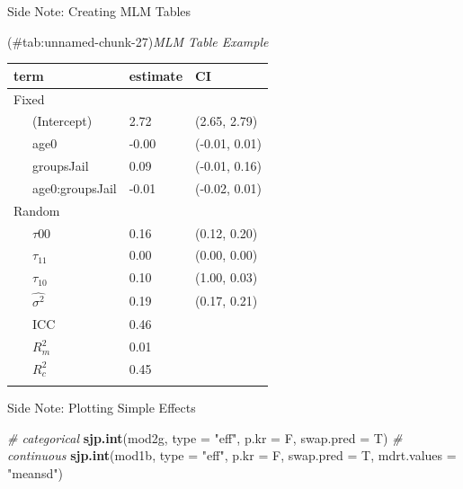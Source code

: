 \documentclass[ignorenonframetext,]{beamer}
\newenvironment{Shaded}{\begin{snugshade}}{\end{snugshade}}
\newcommand{\KeywordTok}[1]{\textcolor[rgb]{0.13,0.29,0.53}{\textbf{{#1}}}}
\newcommand{\DataTypeTok}[1]{\textcolor[rgb]{0.13,0.29,0.53}{{#1}}}
\newcommand{\DecValTok}[1]{\textcolor[rgb]{0.00,0.00,0.81}{{#1}}}
\newcommand{\StringTok}[1]{\textcolor[rgb]{0.31,0.60,0.02}{{#1}}}
\newcommand{\CommentTok}[1]{\textcolor[rgb]{0.56,0.35,0.01}{\textit{{#1}}}}
\newcommand{\NormalTok}[1]{{#1}}
\begin{document}
\begin{frame}[fragile]{Side Note: Creating MLM Tables}

\footnotesize

\begin{Shaded}
\end{Shaded}

(\#tab:unnamed-chunk-27)\emph{MLM Table Example}

\begin{longtable}[]{@{}lll@{}}
\toprule
term & estimate & CI\tabularnewline
\midrule
\endhead
Fixed & &\tabularnewline
~~~(Intercept) & 2.72 & (2.65, 2.79)\tabularnewline
~~~age0 & -0.00 & (-0.01, 0.01)\tabularnewline
~~~groupsJail & 0.09 & (-0.01, 0.16)\tabularnewline
~~~age0:groupsJail & -0.01 & (-0.02, 0.01)\tabularnewline
Random & &\tabularnewline
~~~\(\tau{00}\) & 0.16 & (0.12, 0.20)\tabularnewline
~~~\(\tau_{11}\) & 0.00 & (0.00, 0.00)\tabularnewline
~~~\(\tau_{10}\) & 0.10 & (1.00, 0.03)\tabularnewline
~~~\(\hat{\sigma^2}\) & 0.19 & (0.17, 0.21)\tabularnewline
~~~ICC & 0.46 &\tabularnewline
~~~\(R^2_m\) & 0.01 &\tabularnewline
~~~\(R^2_c\) & 0.45 &\tabularnewline
\normalsize & &\tabularnewline
\bottomrule
\end{longtable}

\end{frame}

\begin{frame}[fragile]{Side Note: Plotting Simple Effects}

\footnotesize

\begin{Shaded}
\begin{Highlighting}[]
\CommentTok{# categorical}
\KeywordTok{sjp.int}\NormalTok{(mod2g, }\DataTypeTok{type =} \StringTok{"eff"}\NormalTok{, }\DataTypeTok{p.kr =} \NormalTok{F, }\DataTypeTok{swap.pred =} \NormalTok{T)}
\CommentTok{# continuous}
\KeywordTok{sjp.int}\NormalTok{(mod1b, }\DataTypeTok{type =} \StringTok{"eff"}\NormalTok{, }\DataTypeTok{p.kr =} \NormalTok{F, }\DataTypeTok{swap.pred =} \NormalTok{T, }
        \DataTypeTok{mdrt.values =} \StringTok{"meansd"}\NormalTok{)}
\end{Highlighting}
\end{Shaded}

\end{frame}
\end{document}
